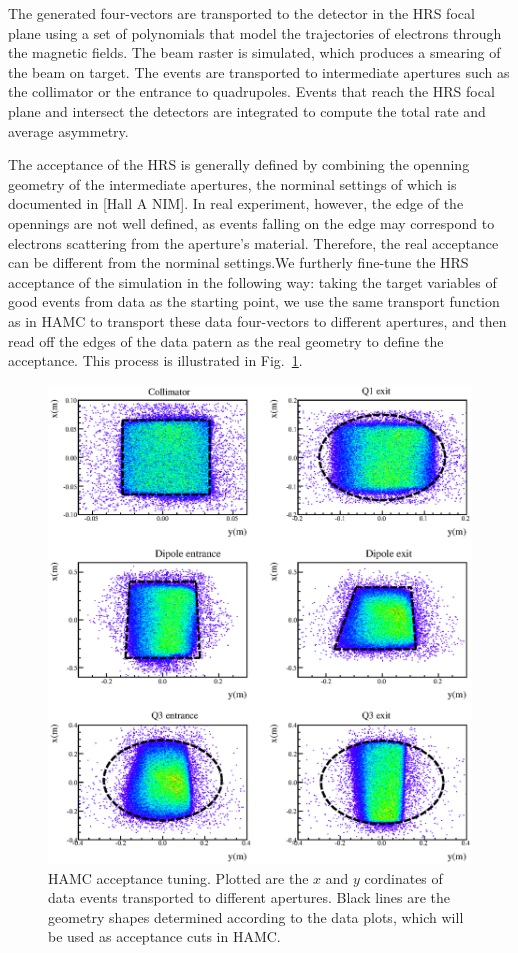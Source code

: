 The generated four-vectors are transported to the detector in the HRS focal plane using 
a set of polynomials that model the trajectories of electrons through the magnetic fields.
The beam raster is simulated, which produces a smearing of the beam on target.
The events are transported to intermediate apertures such as the collimator 
or the entrance to quadrupoles. 
Events that reach the HRS focal plane and intersect the detectors are integrated 
to compute the total rate and average asymmetry.

The acceptance of the HRS is generally defined by combining the openning geometry of the intermediate apertures, the norminal settings of which is documented in [Hall A NIM]. In real experiment, however, the edge of the opennings are not well defined, as events falling on the edge may correspond to electrons scattering from the aperture's material. Therefore, the real acceptance can be different from the norminal settings.We furtherly fine-tune the HRS acceptance of the simulation in the following way: taking the target variables of good events from data as the starting point, we use the same transport function as in HAMC to transport these data four-vectors to different apertures, and then read off the edges of the data patern as the real geometry to define the acceptance. This process is illustrated in Fig.~\ref{fig:hamc_acc}.

\begin{figure}[!pt]
\centering
\includegraphics{DW/acceptance.eps}
\caption{HAMC acceptance tuning. Plotted are the $x$ and $y$ cordinates of data events transported to different apertures. Black lines are the geometry shapes determined according to the data plots, which will be used as acceptance cuts in HAMC.}\label{fig:hamc_acc}
\end{figure}


